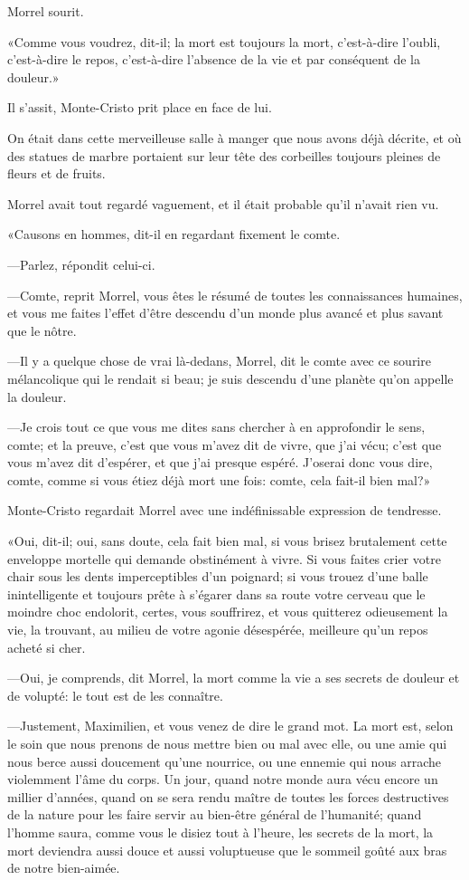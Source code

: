 Morrel sourit. 

«Comme vous voudrez, dit-il; la mort est toujours la mort, c'est-à-dire l'oubli, c'est-à-dire le repos, c'est-à-dire l'absence de la vie et par conséquent de la douleur.» 

Il s'assit, Monte-Cristo prit place en face de lui. 

On était dans cette merveilleuse salle à manger que nous avons déjà décrite, et où des statues de marbre portaient sur leur tête des corbeilles toujours pleines de fleurs et de fruits. 

Morrel avait tout regardé vaguement, et il était probable qu'il n'avait rien vu. 

«Causons en hommes, dit-il en regardant fixement le comte. 

—Parlez, répondit celui-ci. 

—Comte, reprit Morrel, vous êtes le résumé de toutes les connaissances humaines, et vous me faites l'effet d'être descendu d'un monde plus avancé et plus savant que le nôtre. 

—Il y a quelque chose de vrai là-dedans, Morrel, dit le comte avec ce sourire mélancolique qui le rendait si beau; je suis descendu d'une planète qu'on appelle la douleur. 

—Je crois tout ce que vous me dites sans chercher à en approfondir le sens, comte; et la preuve, c'est que vous m'avez dit de vivre, que j'ai vécu; c'est que vous m'avez dit d'espérer, et que j'ai presque espéré. J'oserai donc vous dire, comte, comme si vous étiez déjà mort une fois: comte, cela fait-il bien mal?» 

Monte-Cristo regardait Morrel avec une indéfinissable expression de tendresse. 

«Oui, dit-il; oui, sans doute, cela fait bien mal, si vous brisez brutalement cette enveloppe mortelle qui demande obstinément à vivre. Si vous faites crier votre chair sous les dents imperceptibles d'un poignard; si vous trouez d'une balle inintelligente et toujours prête à s'égarer dans sa route votre cerveau que le moindre choc endolorit, certes, vous souffrirez, et vous quitterez odieusement la vie, la trouvant, au milieu de votre agonie désespérée, meilleure qu'un repos acheté si cher. 

—Oui, je comprends, dit Morrel, la mort comme la vie a ses secrets de douleur et de volupté: le tout est de les connaître. 

—Justement, Maximilien, et vous venez de dire le grand mot. La mort est, selon le soin que nous prenons de nous mettre bien ou mal avec elle, ou une amie qui nous berce aussi doucement qu'une nourrice, ou une ennemie qui nous arrache violemment l'âme du corps. Un jour, quand notre monde aura vécu encore un millier d'années, quand on se sera rendu maître de toutes les forces destructives de la nature pour les faire servir au bien-être général de l'humanité; quand l'homme saura, comme vous le disiez tout à l'heure, les secrets de la mort, la mort deviendra aussi douce et aussi voluptueuse que le sommeil goûté aux bras de notre bien-aimée. 

